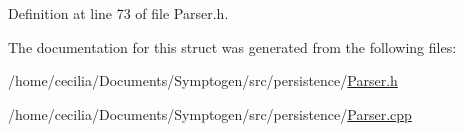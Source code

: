 Definition at line 73 of file Parser.\-h.



The documentation for this struct was generated from the following files\-:\begin{DoxyCompactItemize}
\item 
/home/cecilia/\-Documents/\-Symptogen/src/persistence/\hyperlink{_parser_8h}{Parser.\-h}\item 
/home/cecilia/\-Documents/\-Symptogen/src/persistence/\hyperlink{_parser_8cpp}{Parser.\-cpp}\end{DoxyCompactItemize}
